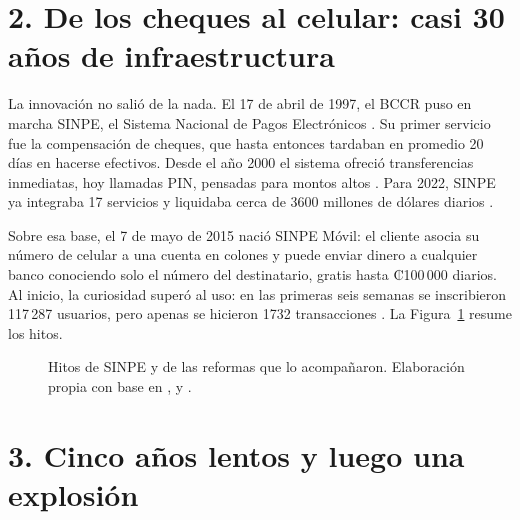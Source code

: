 \documentclass[11pt,letterpaper]{article}
\begin{document}
\section*{2. De los cheques al celular: casi 30 años de infraestructura}

La innovación no salió de la nada. El 17 de abril de 1997, el BCCR puso en
marcha SINPE, el Sistema Nacional de Pagos Electrónicos \parencite{bccr_sinpe}.
Su primer servicio fue la compensación de cheques, que hasta entonces tardaban
en promedio 20 días en hacerse efectivos. Desde el año 2000 el sistema ofreció
transferencias inmediatas, hoy llamadas PIN, pensadas para montos altos
\parencite{araujo2024}. Para 2022, SINPE ya integraba 17 servicios y liquidaba
cerca de 3600 millones de dólares diarios \parencite{alvarado2022}.

Sobre esa base, el 7 de mayo de 2015 nació SINPE Móvil: el cliente asocia su
número de celular a una cuenta en colones y puede enviar dinero a cualquier
banco conociendo solo el número del destinatario, gratis hasta ₡100\,000
diarios. Al inicio, la curiosidad superó al uso: en las primeras seis semanas
se inscribieron 117\,287 usuarios, pero apenas se hicieron 1732 transacciones
\parencite{telesemana2015}. La Figura~\ref{fig:linea} resume los hitos.

\begin{figure}[H]
\centering
{}
\caption{Hitos de SINPE y de las reformas que lo acompañaron. Elaboración propia
con base en \Textcite{araujo2024}, \Textcite{bccr2025fiscal} y
\Textcite{arias2026}.}
\label{fig:linea}
\end{figure}

\section*{3. Cinco años lentos y luego una explosión}
\end{document}
